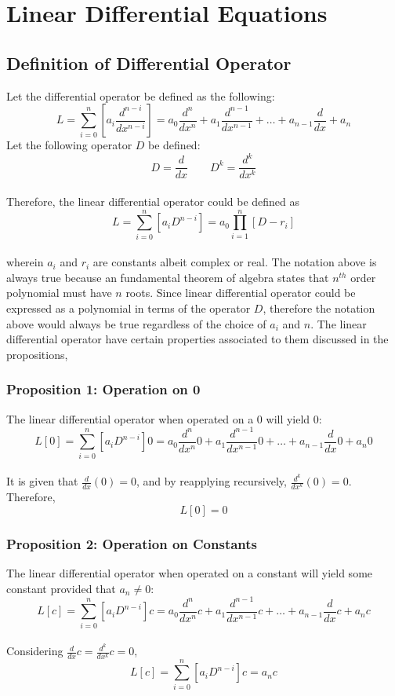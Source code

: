 \chapter{Linear Differential Equations}
\begin{comment}
\end{comment}
\section{Definition of Differential Operator}
\begin{comment}
\end{comment}
Let the differential operator be defined as the following: 
$$L = \sum_{i = 0}^{n}\left[a_i \frac{d^{n - i}}{dx^{n - i}}\right] = a_0 \frac{d^{n }}{dx^{n}} + a_1 \frac{d^{n - 1}}{dx^{n - 1}}+ \dots + a_{n - 1}\frac{d}{dx} + a_n$$
Let the following operator $D$ be defined:
$$D = \frac{d}{dx} \qquad D^k = \frac{d^k}{dx^k}$$
\\Therefore, the linear differential operator could be defined as 
$$L = \sum_{i = 0}^{n}\left[a_i D^{n - i}\right] = a_0\prod_{i = 1}^{n}\left[D - r_i\right]$$
\\wherein $a_i$ and $r_i$ are constants albeit complex or real. The notation above is always true because an fundamental theorem of algebra states that $n^{th}$ order polynomial must have $n$ roots. Since linear differential operator could be expressed as a polynomial in terms of the operator $D$, therefore the notation above would always be true regardless of the choice of $a_i$ and $n$. The linear differential operator have certain properties associated to them discussed in the propositions,
\subsection{Proposition 1: Operation on 0} 
\begin{comment}
\end{comment}
The linear differential operator when operated on a 0 will yield 0:
$$L[0]=\sum_{i = 0}^{n}\left[a_i D^{n - i}\right]0=a_0 \frac{d^{n }}{dx^{n}}0 + a_1 \frac{d^{n - 1}}{dx^{n - 1}}0+ \dots + a_{n - 1}\frac{d}{dx}0 + a_n0$$ 
\\It is given that $\displaystyle{\frac{d}{dx}(0) = 0}$, and by reapplying recursively, $\displaystyle{\frac{d^k}{dx^k}(0) = 0}$. Therefore, 
$$L[0]=0$$
\subsection{Proposition 2: Operation on Constants}
\begin{comment}
\end{comment}
The linear differential operator when operated on a constant will yield some constant provided that $a_n \neq 0$:
$$L[c] = \sum_{i = 0}^{n}\left[a_i D^{n - i}\right]c = a_0 \frac{d^{n }}{dx^{n}}c + a_1 \frac{d^{n - 1}}{dx^{n - 1}}c+ \dots + a_{n - 1}\frac{d}{dx}c + a_nc$$
\\Considering $\displaystyle{\frac{d}{dx}c = \frac{d^k}{dx^k}c = 0}$,
$$L[c] = \sum_{i = 0}^{n}\left[a_i D^{n - i}\right]c = a_nc$$
